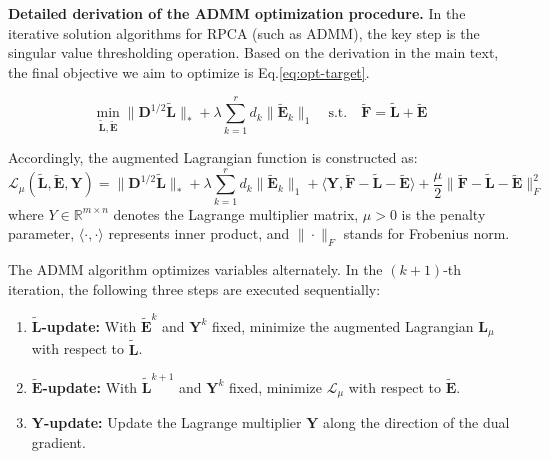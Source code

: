 \noindent\textbf{Detailed derivation of the ADMM optimization procedure.} 
In the iterative solution algorithms for RPCA (such as ADMM), the key step is the singular value thresholding operation. Based on the derivation in the main text, the final objective we aim to optimize is Eq.\eqref{eq:opt-target}.

\begin{equation}
    \min_{\tilde{\mathbf{L}}, \tilde{\mathbf{E}}} \|\mathbf{D}^{1/2} \tilde{\mathbf{L}}\|_* + \lambda \sum_{k=1}^r d_k \|\tilde{\mathbf{E}}_{k}\|_1 \quad \text{s.t.} \quad \tilde{\mathbf{F}} = \tilde{\mathbf{L}} + \tilde{\mathbf{E}}
    \label{eq:opt-target}
\end{equation}

Accordingly, the augmented Lagrangian function is constructed as:
\begin{equation}
\mathcal{L}_{\mu}(\tilde{\mathbf{L}}, \tilde{\mathbf{E}}, \mathbf{Y}) = 
\|\mathbf{D}^{1/2} \tilde{\mathbf{L}}\|_* 
+ \lambda \sum_{k=1}^{r} d_k \|\tilde{\mathbf{E}}_{k}\|_1 
+ \langle \mathbf{Y}, \tilde{\mathbf{F}} - \tilde{\mathbf{L}} - \tilde{\mathbf{E}} \rangle 
+ \frac{\mu}{2} \|\tilde{\mathbf{F}} - \tilde{\mathbf{L}} - \tilde{\mathbf{E}}\|_F^2
\end{equation}
where $Y \in \mathbb{R}^{m \times n}$ denotes the Lagrange multiplier matrix, $\mu > 0$ is the penalty parameter, $\langle \cdot, \cdot \rangle$ represents inner product, and  $\|\cdot\|_F$ stands for Frobenius norm.

The ADMM algorithm optimizes variables alternately. In the $(k+1)$-th iteration, the following three steps are executed sequentially:
\begin{enumerate}
    \item \textbf{$\tilde{\mathbf{L}}$-update:} With $\tilde{\mathbf{{E}}}^k$ and $\mathbf{Y}^k$ fixed, minimize the augmented Lagrangian $\mathcal{\mathbf{L}}_\mu$ with respect to $\tilde{\mathbf{L}}$.
    
    \item \textbf{$\tilde{\mathbf{E}}$-update:} With $\tilde{\mathbf{L}}^{k+1}$ and $\mathbf{Y}^k$ fixed, minimize $\mathcal{L}_\mu$ with respect to $\tilde{\mathbf{E}}$.
    
    \item \textbf{$\mathbf{Y}$-update:} Update the Lagrange multiplier $\mathbf{Y}$ along the direction of the dual gradient.
\end{enumerate}

